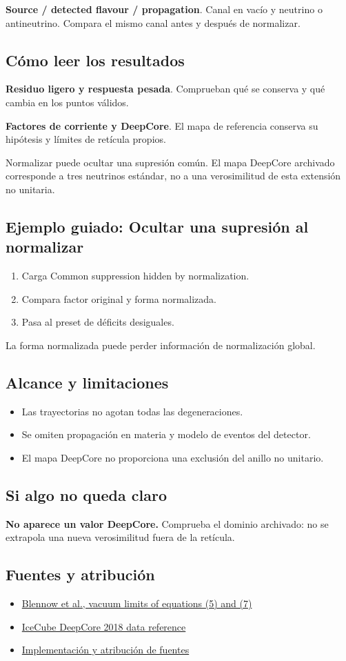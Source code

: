 \documentclass[11pt,a4paper]{article}
\begin{document}
\textbf{Source / detected flavour / propagation}. Canal en vacío y neutrino o antineutrino. Compara el mismo canal antes y después de normalizar.

\subsection*{Cómo leer los resultados}
\textbf{Residuo ligero y respuesta pesada}. Comprueban qué se conserva y qué cambia en los puntos válidos.

\textbf{Factores de corriente y DeepCore}. El mapa de referencia conserva su hipótesis y límites de retícula propios.

Normalizar puede ocultar una supresión común. El mapa DeepCore archivado corresponde a tres neutrinos estándar, no a una verosimilitud de esta extensión no unitaria.
\subsection*{Ejemplo guiado: Ocultar una supresión al normalizar}
\begin{enumerate}
\item Carga Common suppression hidden by normalization.
\item Compara factor original y forma normalizada.
\item Pasa al preset de déficits desiguales.
\end{enumerate}
La forma normalizada puede perder información de normalización global.
\subsection*{Alcance y limitaciones}
\begin{itemize}
\item Las trayectorias no agotan todas las degeneraciones.
\item Se omiten propagación en materia y modelo de eventos del detector.
\item El mapa DeepCore no proporciona una exclusión del anillo no unitario.
\end{itemize}
\subsection*{Si algo no queda claro}
\textbf{No aparece un valor DeepCore.} Comprueba el dominio archivado: no se extrapola una nueva verosimilitud fuera de la retícula.

\subsection*{Fuentes y atribución}
\begin{itemize}
\item \href{https://arxiv.org/abs/1609.08637}{Blennow et al., vacuum limits of equations (5) and (7)}
\item \href{https://doi.org/10.21234/B4105H}{IceCube DeepCore 2018 data reference}
\item \href{https://github.com/karlesmarin/ghu-lab/blob/main/src/modules/neutrino_research.mjs}{Implementación y atribución de fuentes}
\end{itemize}
\end{document}
